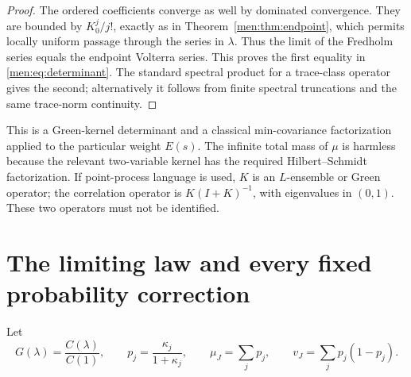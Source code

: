\documentclass[11pt,letterpaper]{article}
\theoremstyle{remark}\newtheorem{remark}[theorem]{Remark}
\begin{document}
\begin{proof}
The ordered coefficients converge as well by dominated convergence. They are bounded by $K_0^j/j!$, exactly as in Theorem~\ref{men:thm:endpoint}, which permits locally uniform passage through the series in $\lambda$. Thus the limit of the Fredholm series equals the endpoint Volterra series. This proves the first equality in \eqref{men:eq:determinant}. The standard spectral product for a trace-class operator gives the second; alternatively it follows from finite spectral truncations and the same trace-norm continuity.
\end{proof}

This is a Green-kernel determinant and a classical min-covariance factorization applied to the particular weight $E(s)$. The infinite total mass of $\mu$ is harmless because the relevant two-variable kernel has the required Hilbert--Schmidt factorization. If point-process language is used, $K$ is an $L$-ensemble or Green operator; the correlation operator is $K(I+K)^{-1}$, with eigenvalues in $(0,1)$. These two operators must not be identified.

\section{The limiting law and every fixed probability correction}\label{men:sec:probability}
Let
\begin{equation}\label{men:eq:limitingpgf}
 G(\lambda)=\frac{C(\lambda)}{C(1)},\qquad
 p_j=\frac{\kappa_j}{1+\kappa_j},\qquad
 \mu_J=\sum_jp_j,\qquad v_J=\sum_jp_j(1-p_j).
\end{equation}
\end{document}
